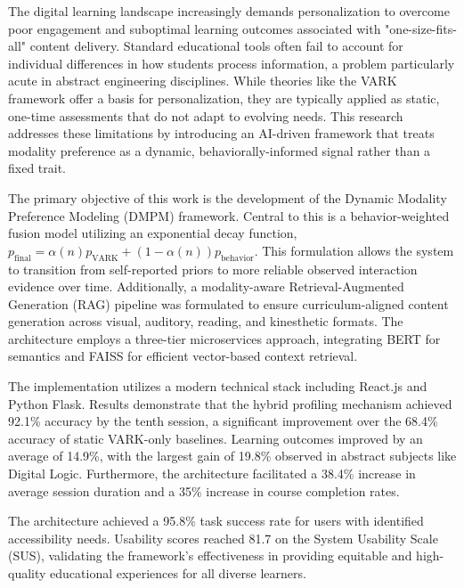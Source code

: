 \vspace{-1cm}

The digital learning landscape increasingly demands personalization to overcome poor engagement and suboptimal learning outcomes associated with "one-size-fits-all" content delivery. Standard educational tools often fail to account for individual differences in how students process information, a problem particularly acute in abstract engineering disciplines. While theories like the VARK framework offer a basis for personalization, they are typically applied as static, one-time assessments that do not adapt to evolving needs. This research addresses these limitations by introducing an AI-driven framework that treats modality preference as a dynamic, behaviorally-informed signal rather than a fixed trait.

The primary objective of this work is the development of the Dynamic Modality Preference Modeling (DMPM) framework. Central to this is a behavior-weighted fusion model utilizing an exponential decay function, $p_{\text{final}} = \alpha(n)p_{\text{VARK}} + (1 - \alpha(n))p_{\text{behavior}}$. This formulation allows the system to transition from self-reported priors to more reliable observed interaction evidence over time. Additionally, a modality-aware Retrieval-Augmented Generation (RAG) pipeline was formulated to ensure curriculum-aligned content generation across visual, auditory, reading, and kinesthetic formats. The architecture employs a three-tier microservices approach, integrating BERT for semantics and FAISS for efficient vector-based context retrieval.

The implementation utilizes a modern technical stack including React.js and Python Flask. Results demonstrate that the hybrid profiling mechanism achieved 92.1\% accuracy by the tenth session, a significant improvement over the 68.4\% accuracy of static VARK-only baselines. Learning outcomes improved by an average of 14.9\%, with the largest gain of 19.8\% observed in abstract subjects like Digital Logic. Furthermore, the architecture facilitated a 38.4\% increase in average session duration and a 35\% increase in course completion rates.

The architecture achieved a 95.8\% task success rate for users with identified accessibility needs. Usability scores reached 81.7 on the System Usability Scale (SUS), validating the framework's effectiveness in providing equitable and high-quality educational experiences for all diverse learners.
\pagebreak